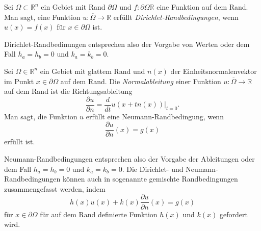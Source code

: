 \begin{definition}
Sei $\Omega\subset\mathbb{R}^n$ ein Gebiet mit Rand $\partial\Omega$
und $f\colon \partial\Omega\mathbb R$ eine Funktion auf dem Rand.
Man sagt, eine Funktion $u\colon\overline{\Omega}\to\mathbb{R}$ erfüllt 
{\em Dirichlet-Randbedingungen}, wenn
%
%
\(
u(x) = f(x)
\)
für $x\in \partial\Omega$ ist.
\end{definition}

Dirichlet-Randbedinungen entsprechen also der Vorgabe von Werten
oder dem Fall $h_a=h_b=0$ und $k_a=k_b=0$.

\begin{definition}
Sei $\Omega\in\mathbb{R}^n$ ein Gebiet mit glattem Rand und
$n(x)$ der Einheitsnormalenvektor im Punkt $x\in\partial\Omega$
auf dem Rand.
Die {\em Normalableitung} einer Funktion
%
$u\colon\overline{\Omega}\to \mathbb{R}$ auf dem Rand ist die
Richtungsableitung
\[
\frac{\partial u}{\partial n}
=
\frac{d}{dt} u(x+tn(x))\bigg|_{t=0}.
\]
Man sagt, die Funktion $u$ erfüllt eine Neumann-Randbedingung, wenn
%
%
\[
\frac{\partial u}{\partial n}(x) = g(x)
\]
erfüllt ist.
\end{definition}

Neumann-Randbedingungen entsprechen also der Vorgabe der Ableitungen
oder dem Fall $h_a=h_b=0$ und $k_a=k_b=0$.
Die Dirichlet- und Neumann-Randbedingungen können auch in sogenannte
gemischte Randbedingungen zusammengefasst werden, indem 
%
%
\begin{equation}
h(x) u(x) + k(x) \frac{\partial u}{\partial n}(x) = g(x)
\label{buch:orthofunkt:pde:eqn:gemischterandbedingung}
\end{equation}
für  $x \in\partial \Omega$ für auf dem Rand definierte Funktion
$h(x)$ und $k(x)$ gefordert wird.

%
%
